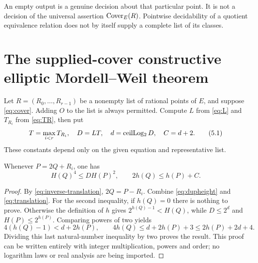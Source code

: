 An empty output is a genuine decision about that particular
point. It is not a decision of the universal assertion
$\operatorname{Cover}_E(R)$. Pointwise decidability of a quotient equivalence relation
does not by itself supply a complete list of its classes.

\section{The supplied-cover constructive elliptic Mordell--Weil theorem}
\label{sec:cover-thm}

Let $R=(R_0,\ldots,R_{r-1})$ be a nonempty list of rational points of
$E$, and suppose \eqref{eq:cover}. Adding $O$ to the list is always
permitted. Compute $L$ from \eqref{eq:L} and $T_{R_i}$ from
\eqref{eq:TR}, then put
\[
 T=\max_{i<r}T_{R_i},\quad
 D=LT,\quad d=\operatorname{ceilLog_2} D,\quad C=d+2.
 \tag{5.1}\label{eq:cutoff}
\]
These constants depend only on the given equation and representative list.

\begin{lemma}\label{lem:bitcontract}
Whenever $P=2Q+R_i$, one has
\[
          H(Q)^4\le D H(P)^2,\qquad
          2h(Q)\le h(P)+C.
 \tag{5.2}\label{eq:bitcontract}
\]
\end{lemma}
\begin{proof}
By \eqref{eq:inverse-translation}, $2Q=P-R_i$.
Combine \eqref{eq:dupheight} and \eqref{eq:translation}.
For the second inequality, if $h(Q)=0$ there is nothing to prove.
Otherwise the definition of $h$ gives
$2^{h(Q)-1}<H(Q)$, while $D\le2^d$ and $H(P)\le2^{h(P)}$.
Comparing powers of two yields
\[
 4(h(Q)-1)<d+2h(P),
 \qquad
 4h(Q)\le d+2h(P)+3\le2h(P)+2d+4.
 \tag{5.3}
\]
Dividing this last natural-number inequality by two proves the result.
This proof can be written entirely with integer multiplication, powers and
order; no logarithm laws or real analysis are being imported.
\end{proof}

